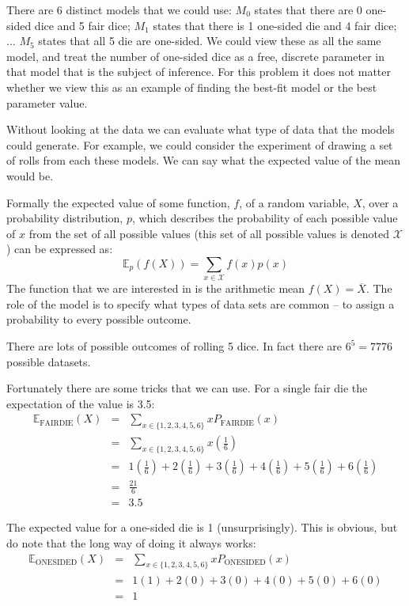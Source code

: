 \documentclass[11pt]{article}
\begin{document}
There are 6 distinct models that we could use: $M_0$ states that there are 0 one-sided dice and 5 fair dice; $M_1$ states that there is 1 one-sided die and 4 fair dice; $\ldots$ $M_5$ states that all 5 die are one-sided.
We could view these as all the same model, and treat the number of one-sided dice as a free, discrete parameter in that model that is the subject of inference.
For this problem it does not matter whether we view this as an example of finding the best-fit model or the best parameter value.

Without looking at the data we can evaluate what type of data that the models could generate.  
For example, we could consider the experiment of drawing a set of rolls from each these models.  We can say what the expected value of the mean would be.

Formally the expected value of some function, $f$, of a random variable, $X$, over a probability distribution, $p$, which describes the probability of each possible value of $x$ from the set of all possible values (this set of all possible values is denoted ${\mathcal X}$) can be expressed as:
\begin{equation}
	\mathbb E_{p}(f({X})) = \sum_{x\in {\mathcal X}} f({x})p(x)
\end{equation}
The function that we are interested in is the arithmetic mean $f(X) = \overline{X}$.
The role of the model is to specify what types of data sets are common -- to assign a probability to every possible outcome.

There are lots of possible outcomes of rolling 5 dice. In fact there are $6^5=7776$ possible datasets.

Fortunately there are some tricks that we can use.
For a single fair die the expectation of the value is 3.5:
\begin{eqnarray}
	\mathbb E_{\mbox{FAIRDIE}}(X) & = & \sum_{x\in \{1,2,3,4,5,6\}} x P_{\mbox{FAIRDIE}}(x) \\
	& = & \sum_{x\in \{1,2,3,4,5,6\}} x \left(\frac{1}{6}\right) \\
	& = &   1 \left(\frac{1}{6}\right) + 2 \left(\frac{1}{6}\right)+ 3 \left(\frac{1}{6}\right)+ 4 \left(\frac{1}{6}\right)+ 5 \left(\frac{1}{6}\right)+ 6 \left(\frac{1}{6}\right) \\
	& = & \frac{21}{6} \\
	& = & 3.5
\end{eqnarray}

The expected value for a one-sided die is 1 (unsurprisingly). This is obvious, but do note that the long way of doing it always works:
\begin{eqnarray}
	\mathbb E_{\mbox{ONESIDED}}(X) & = & \sum_{x\in \{1,2,3,4,5,6\}} x P_{\mbox{ONESIDED}}(x) \\
	& = &   1 \left(1\right) + 2 \left(0\right)+ 3 \left(0\right)+ 4 \left(0\right)+ 5 \left(0\right)+ 6 \left(0\right) \\
	& = & 1
\end{eqnarray}
\end{document}
